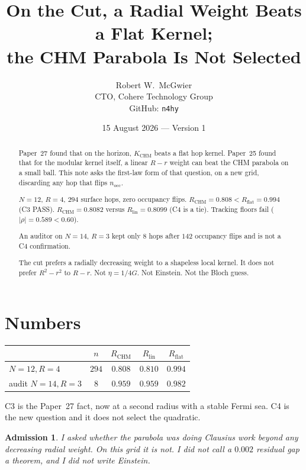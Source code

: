 \documentclass[11pt]{article}
\title{\textbf{On the Cut, a Radial Weight Beats a Flat Kernel;\\
the CHM Parabola Is Not Selected}}
\author{Robert W.\ McGwier\\
\small CTO, Cohere Technology Group\\
\small GitHub: \texttt{n4hy}}
\date{15 August 2026 --- Version 1}
\newtheorem*{admission}{Admission}
\begin{document}
\maketitle

\begin{abstract}
\noindent
Paper~27 found that on the horizon, $K_{\mathrm{CHM}}$ beats a
flat hop kernel. Paper~25 found that for the modular kernel
itself, a linear $R-r$ weight can beat the CHM parabola on a
small ball. This note asks the first-law form of that question,
on a new grid, discarding any hop that flips $n_{\mathrm{occ}}$.

$N=12$, $R=4$, $294$ surface hops, zero occupancy flips.
$R_{\mathrm{CHM}}=0.808<R_{\mathrm{flat}}=0.994$ (C3 PASS).
$R_{\mathrm{CHM}}=0.8082$ versus $R_{\mathrm{lin}}=0.8099$
(C4 is a tie). Tracking floors fail
($\lvert\rho\rvert=0.589<0.60$).

An auditor on $N=14$, $R=3$ kept only $8$ hops after $142$
occupancy flips and is not a C4 confirmation.

The cut prefers a radially decreasing weight to a shapeless
local kernel. It does not prefer $R^2-r^2$ to $R-r$.
Not $\eta=1/4G$. Not Einstein. Not the Bloch guess.
\end{abstract}

\section{Numbers}

\begin{center}
\begin{tabular}{lcccc}
\hline
 & $n$ & $R_{\mathrm{CHM}}$ & $R_{\mathrm{lin}}$ & $R_{\mathrm{flat}}$ \\
\hline
$N=12,R=4$ & $294$ & $0.808$ & $0.810$ & $0.994$ \\
audit $N=14,R=3$ & $8$ & $0.959$ & $0.959$ & $0.982$ \\
\hline
\end{tabular}
\end{center}

C3 is the Paper~27 fact, now at a second radius with a stable
Fermi sea. C4 is the new question and it does not select the
quadratic.

\begin{admission}
I asked whether the parabola was doing Clausius work beyond any
decreasing radial weight. On this grid it is not. I did not
call a $0.002$ residual gap a theorem, and I did not write
Einstein.
\end{admission}
\end{document}
